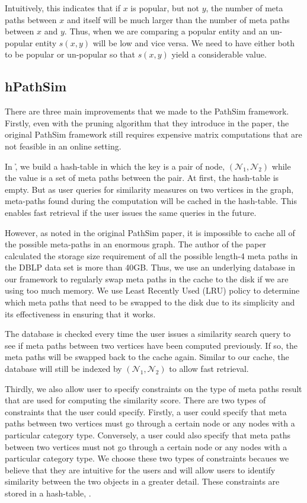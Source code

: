 Intuitively, this indicates that if $x$ is popular, but not $y$, the number of
meta paths between $x$ and itself will be much larger than the number of
meta paths between $x$ and $y$. Thus, when we are comparing a popular entity
and an un-popular entity $s(x,y)$ will be low and vice versa. We need to have
either both to be popular or un-popular so that $s(x,y)$ yield a considerable
value.

\subsection{hPathSim}

There are three main improvements that we made to the PathSim framework.
Firstly, even with the pruning algorithm that they introduce in the paper,
the original PathSim framework still requires expensive matrix computations
that are not feasible in an online setting.


In \h, we build a hash-table in which the key is a pair of node,
$(\mathcal{N}_1, \mathcal{N}_2)$ while the value is a set of meta paths between
the pair.  At first, the hash-table is empty. But as user queries for
similarity measures on two vertices in the graph, meta-paths found during the
computation will be cached in the hash-table. This enables fast retrieval if
the user issues the same queries in the future.

However, as noted in the original PathSim paper, it is impossible to cache all
of the possible meta-paths in an enormous graph. The author of the paper
calculated the storage size requirement of all the possible length-4 meta paths
in the DBLP data set is more than 40GB. Thus, we use an underlying database in
our framework to regularly swap meta paths in the cache to the disk if we are
using too much memory. We use Least Recently Used (LRU) policy to determine
which meta paths that need to be swapped to the disk due to its simplicity and
its effectiveness in ensuring that it works.

The database is checked every time the user issues a similarity search query to
see if meta paths between two vertices have been computed previously. If so, the
meta paths will be swapped back to the cache again. Similar to our cache, the
database will still be indexed by $(\mathcal{N}_1, \mathcal{N}_2)$ to allow
fast retrieval.

Thirdly, we also allow user to specify constraints on the type of meta paths
result that are used for computing the similarity score. There are two types of
constraints that the user could specify. Firstly, a user could specify that
meta paths between two vertices must go through a certain node or any nodes
with a particular category type. Conversely,  a user could also specify that
meta paths between two vertices must not go through a certain node or any nodes
with a particular category type. We choose these two types of constraints
becaues we believe that they are intuitive for the users and will allow users
to identify similarity between the two objects in a greater detail. These
constraints are stored in a hash-table, \cTable.

